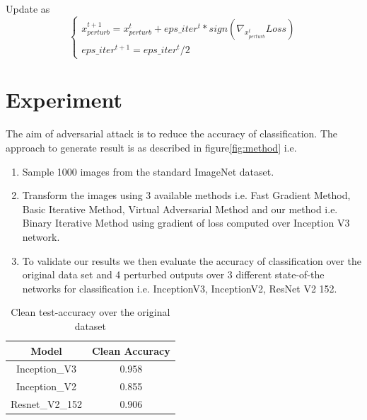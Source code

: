 \documentclass[letterpaper]{article}
\begin{document}
Update as
\begin{equation}
\begin{cases}
x_{perturb}^{t+1} = x_{perturb}^{t} + eps\_iter^{t}* sign ( {\nabla_{x_{perturb}^{t}} Loss} )\\
eps\_iter^{t+1}= eps\_iter^{t}/2
   \end{cases}
   \label{eqn:}
\end{equation}



\section{Experiment}

The aim of adversarial attack is to reduce the accuracy of classification.
The approach to generate result is as described in figure\ref{fig:method} i.e.
\begin{enumerate}
\item Sample 1000  images  from  the  standard  ImageNet dataset.
\item Transform the images using 3 available methods i.e.  Fast Gradient Method, Basic Iterative Method, Virtual Adversarial Method and our method i.e.  Binary Iterative Method using gradient of loss computed over Inception V3 network.
\item To validate our results we then evaluate the accuracy of classification over the original data set and 4 perturbed outputs over 3 different state-of-the networks for classification i.e. InceptionV3, InceptionV2, ResNet V2 152.

\end{enumerate}





\begin{table}
  \centering
    \begin{tabular}{|c|c|}
\hline
\textbf{Model} & \textbf{Clean Accuracy} \\
\hline
     Inception\_V3 & 0.958 \\
     \hline
     Inception\_V2 & 0.855 \\
     \hline
     Resnet\_V2\_152 & 0.906 \\
     \hline
\end{tabular}

\caption{Clean test-accuracy over the original dataset}
\end{table}
\end{document}
